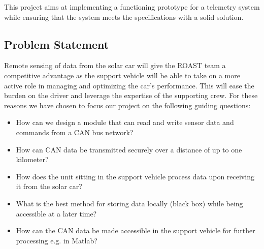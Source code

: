 \documentclass[a4paper,conference]{IEEEtran}
\begin{document}

This project aims at implementing a functioning prototype for a telemetry system while ensuring that the system meets the specifications with a solid solution.


\subsection{Problem Statement}
Remote sensing of data from the solar car will give the ROAST team a competitive advantage as the support vehicle will be able to take on a more active role in managing and optimizing the car's performance. This will ease the burden on the driver and leverage the expertise of the supporting crew. For these reasons we have chosen to focus our project on the following guiding questions:
\begin{itemize}
    \item How can we design a module that can read and write sensor data and commands from a CAN bus network? 
    \item How can CAN data be transmitted securely over a distance of up to one kilometer?
    \item How does the unit sitting in the support vehicle process data upon receiving it from the solar car?
    \item What is the best method for storing data locally (black box) while being accessible at a later time?
    \item How can the CAN data be made accessible in the support vehicle for further processing e.g. in Matlab?
\end{itemize}
\end{document}
